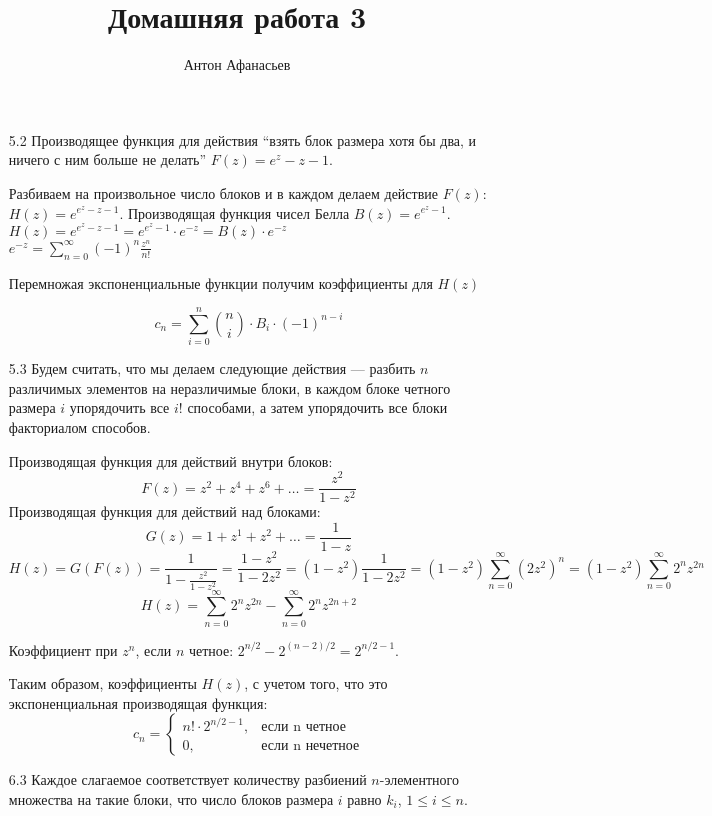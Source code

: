 \documentclass[10pt]{article}
\begin{document}
\title{Домашняя работа 3}
\author{Антон Афанасьев}
\maketitle

\begin{enumerate}
	\item[5.2] Производящее функция для действия ``взять блок размера хотя бы два, и ничего с ним больше не делать'' $F(z) = e^z - z - 1$.
	
	Разбиваем на произвольное число блоков и в каждом делаем действие $F(z)$: $H(z) = e^{e^z -z -1}$. Производящая функция чисел Белла $B(z) = e^{e^z - 1}$.\\
	$H(z) = e^{e^z -z -1} = e^{e^z - 1} \cdot e^{-z} = B(z) \cdot e^{-z}$\\
	$e^{-z} = \sum_{n=0}^{\infty} (-1)^n \frac{z^n}{n!}$
	
	Перемножая экспоненциальные функции получим коэффициенты для $H(z)$
	
	$$c_n = \sum_{i=0}^n \binom{n}{i} \cdot B_i \cdot(-1)^{n-i}$$
	
	\item[5.3] Будем считать, что мы делаем следующие действия --- разбить $n$ различимых элементов на  неразличимые блоки, в каждом блоке четного размера $i$ упорядочить все $i!$ способами, а затем упорядочить все блоки факториалом способов.
	
	Производящая функция для действий внутри блоков:
	$$F(z) = z^2 + z^4 + z^6 + \ldots = \frac{z^2}{1 - z^2}$$
	Производящая функция для действий над блоками:
	$$G(z) = 1 + z^1 + z^2 + \ldots = \frac{1}{1-z}$$
	$$H(z) = G(F(z)) = \frac{1}{1 - \frac{z^2}{1-z^2}} = \frac{1 - z^2}{1 - 2 z^2} = (1-z^2) \frac{1}{1-2z^2} = (1-z^2) \sum_{n=0}^{\infty} \left ( 2 z^2 \right ) ^ n = (1-z^2) \sum_{n=0}^{\infty} 2^n z^{2n}$$
	$$H(z) = \sum_{n=0}^{\infty} 2^n z^{2n}  - \sum_{n=0}^{\infty} 2^n z^{2n + 2}$$
	
	Коэффициент при $z^n$, если $n$ четное: $2^{n/2} - 2^{(n-2)/2} = 2^{n/2 - 1}$.
	
	Таким образом, коэффициенты $H(z)$, с учетом того, что это экспоненциальная производящая функция:
	$$
	c_n = 
		\begin{cases}
			n! \cdot 2^{n/2 - 1},&\text{если n четное}\\
			0,&\text{если n нечетное}
		\end{cases}
	$$
	
	\item[6.3] Каждое слагаемое соответствует количеству разбиений $n$-элементного множества на такие блоки, что число блоков размера $i$ равно $k_i$, $1 \le i \le n$.
\end{enumerate}
\end{document}

